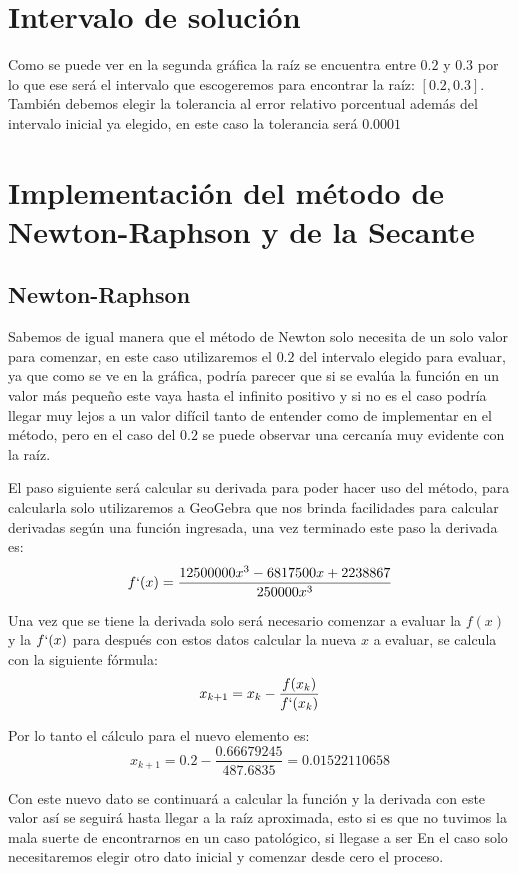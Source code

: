 \documentclass{article}
\begin{document}
\section{Intervalo de solución}
Como se puede ver en la segunda gráfica la raíz se encuentra entre $0.2$ y $0.3$ por lo que ese será el intervalo que escogeremos para encontrar la raíz: $[0.2, 0.3]$.
También debemos elegir la tolerancia al error relativo porcentual además del intervalo inicial ya elegido, en este caso la tolerancia será $0.0001$%


\section{Implementación del método de Newton-Raphson y de la Secante}
\subsection{Newton-Raphson}
Sabemos de igual manera que el método de Newton solo necesita de un solo valor para comenzar, en este caso utilizaremos el $0.2$ del intervalo elegido para evaluar, ya que como se ve en la gráfica, podría parecer que si se evalúa la función en un valor más pequeño este vaya hasta el infinito positivo y si no es el caso
podría llegar muy lejos a un valor difícil tanto de entender como de implementar en el método, pero en el caso del $0.2$ se puede observar una cercanía muy evidente con la raíz.


El paso siguiente será calcular su derivada para poder hacer uso del método, para calcularla solo utilizaremos
a GeoGebra que nos brinda facilidades para calcular derivadas según una función ingresada, una vez terminado este
paso la derivada es: $$f`(x)= \frac{12500000x^3-6817500x+2238867}{250000x^3}$$


Una vez que se tiene la derivada solo será necesario comenzar a evaluar la $f(x)$ y la $f`(x)$ para después con
estos datos calcular la nueva $x$ a evaluar, se calcula con la siguiente fórmula: $$x_{k+1}=x_k-\frac{f(x_k)}{f`(x_k)}$$


Por lo tanto el cálculo para el nuevo elemento es: $$x_{k+1}=0.2-\frac{0.66679245}{487.6835}= 0.01522110658$$


Con este nuevo dato se continuará a calcular la función y la derivada con este valor así se seguirá hasta llegar a
la raíz aproximada, esto si es que no tuvimos la mala suerte de encontrarnos en un caso patológico, si llegase a ser
En el caso solo necesitaremos elegir otro dato inicial y comenzar desde cero el proceso.
\end{document}
